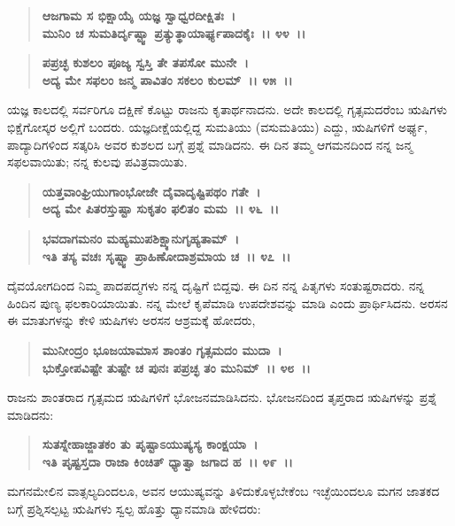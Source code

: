 \begin{verse}
\textbf{ಆಜಗಾಮ ಸ ಭಿಕ್ಷಾಯೈ ಯಜ್ಞ ಸ್ವಾಧ್ವರದೀಕ್ಷಿತಃ~।}\\\textbf{ಮುನಿಂ ಚ ಸುಮತಿರ್ದೃಷ್ಟ್ವಾ ಪ್ರತ್ಯುತ್ಥಾಯಾರ್ಘ್ಯಪಾದಕೈಃ~।। ೪೪~।। }
\end{verse}

\begin{verse}
\textbf{ಪಪ್ರಚ್ಛ ಕುಶಲಂ ಪೂಜ್ಯ ಸ್ವಸ್ತಿ ತೇ ತಪಸೋ ಮುನೇ~।}\\\textbf{ಅದ್ಯ ಮೇ ಸಫಲಂ ಜನ್ಮ ಪಾವಿತಂ ಸಕಲಂ ಕುಲಮ್~।। ೪೫~।।}
\end{verse}

ಯಜ್ಞ ಕಾಲದಲ್ಲಿ ಸರ್ವರಿಗೂ ದಕ್ಷಿಣೆ ಕೊಟ್ಟು ರಾಜನು ಕೃತಾರ್ಥನಾದನು. ಅದೇ ಕಾಲದಲ್ಲಿ ಗೃತ್ಸಮದರೆಂಬ ಋಷಿಗಳು ಭಿಕ್ಷೆಗೋಸ್ಕರ ಅಲ್ಲಿಗೆ ಬಂದರು. ಯಜ್ಞದೀಕ್ಷೆಯಲ್ಲಿದ್ದ ಸುಮತಿಯು (ವಸುಮತಿಯು) ಎದ್ದು, ಋಷಿಗಳಿಗೆ ಅರ್ಘ್ಯ, ಪಾದ್ಯಾದಿಗಳಿಂದ ಸತ್ಕರಿಸಿ ಅವರ ಕುಶಲದ ಬಗ್ಗೆ ಪ್ರಶ್ನೆ ಮಾಡಿದನು. ಈ ದಿನ ತಮ್ಮ ಆಗಮನದಿಂದ ನನ್ನ ಜನ್ಮ ಸಫಲವಾಯಿತು; ನನ್ನ ಕುಲವು ಪವಿತ್ರವಾಯಿತು.

\begin{verse}
\textbf{ಯತ್ತವಾಂಘ್ರಿಯುಗಾಂಭೋಜೇ ದೈವಾದೃಷ್ಟಿಪಥಂ ಗತೇ~।}\\\textbf{ಅದ್ಯ ಮೇ ಪಿತರಸ್ತುಷ್ಟಾ ಸುಕೃತಂ ಫಲಿತಂ ಮಮ~।। ೪೬~।। }
\end{verse}

\begin{verse}
\textbf{ಭವದಾಗಮನಂ ಮಹ್ಯಮುಪಶಿಕ್ಷ್ಯಾನುಗೃಹ್ಯತಾಮ್~।}\\\textbf{ಇತಿ ತಸ್ಯ ವಚಃ ಸೃಷ್ಟ್ವಾ ಪ್ರಾಹಿಣೋದಾಶ್ರಮಾಯ ಚ~।। ೪೭~।।}
\end{verse}

ದೈವಯೋಗದಿಂದ ನಿಮ್ಮ ಪಾದಪದ್ಮಗಳು ನನ್ನ ದೃಷ್ಟಿಗೆ ಬಿದ್ದವು. ಈ ದಿನ ನನ್ನ ಪಿತೃಗಳು ಸಂತುಷ್ಟರಾದರು. ನನ್ನ ಹಿಂದಿನ ಪುಣ್ಯ ಫಲಕಾರಿಯಾಯಿತು. ನನ್ನ ಮೇಲೆ ಕೃಪೆಮಾಡಿ ಉಪದೇಶವನ್ನು ಮಾಡಿ ಎಂದು ಪ್ರಾರ್ಥಿಸಿದನು. ಅರಸನ ಈ ಮಾತುಗಳನ್ನು ಕೇಳಿ ಋಷಿಗಳು ಅರಸನ ಆಶ್ರಮಕ್ಕೆ ಹೋದರು,

\begin{verse}
\textbf{ಮುನೀಂದ್ರಂ ಭೂಜಯಾಮಾಸ ಶಾಂತಂ ಗೃತ್ಸಮದಂ ಮುದಾ~।}\\\textbf{ಭುಕ್ತೋಪವಿಷ್ಟೇ ತುಷ್ಟೇ ಚ ಪುನಃ ಪಪ್ರಚ್ಛ ತಂ ಮುನಿಮ್~।। ೪೮~।।}
\end{verse}

ರಾಜನು ಶಾಂತರಾದ ಗೃತ್ಸಮದ ಋಷಿಗಳಿಗೆ ಭೋಜನಮಾಡಿಸಿದನು. ಭೋಜನದಿಂದ ತೃಪ್ತರಾದ ಋಷಿಗಳನ್ನು ಪ್ರಶ್ನೆ ಮಾಡಿದನು:

\begin{verse}
\textbf{ಸುತಸ್ನೇಹಾಜ್ಜಾತಕಂ ತು ಪೃಷ್ಟಾಽಯುಷ್ಯಸ್ಯ ಕಾಂಕ್ಷಯಾ~।}\\\textbf{ಇತಿ ಪೃಷ್ಟಸ್ತದಾ ರಾಜಾ ಕಿಂಚಿತ್ ಧ್ಯಾತ್ವಾ ಜಗಾದ ಹ~।। ೪೯~।।}
\end{verse}

ಮಗನಮೇಲಿನ ವಾತ್ಸಲ್ಯದಿಂದಲೂ, ಅವನ ಆಯುಷ್ಯವನ್ನು ತಿಳಿದುಕೊಳ್ಳಬೇಕೆಂಬ ಇಚ್ಛೆಯಿಂದಲೂ ಮಗನ ಜಾತಕದ ಬಗ್ಗೆ ಪ್ರಶ್ನಿಸಲ್ಪಟ್ಟ ಋಷಿಗಳು ಸ್ವಲ್ಪ ಹೊತ್ತು ಧ್ಯಾನಮಾಡಿ ಹೇಳಿದರು:

